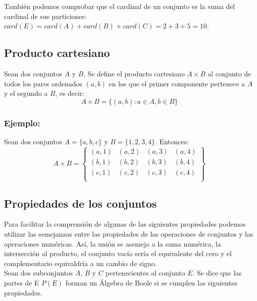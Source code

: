 \documentclass[0_algebra.tex]{subfiles}
\begin{document}
También podemos comprobar que el cardinal de un conjunto es la suma del cardinal de sus particiones:  $card(E)=card(A)+card(B)+card(C)=2+3+5=10$.

\subsection*{Producto cartesiano}
Sean dos conjuntos $A$ y $B$. Se define el producto cartesiano $A\times B$ al conjunto de todos los pares ordenados $(a,b)$ en los que el primer componente pertenece a $A$ y el segundo a $B$, es decir:
$$
A\times B=\lbrace (a,b): a\in A, b\in B \rbrace
$$

\subsubsection*{Ejemplo:}
Sean dos conjuntos $A=\lbrace a,b,c \rbrace$ y $B=\lbrace 1,2,3,4 \rbrace$. Entonces:
$$
A\times B =
\left\lbrace
\begin{matrix}
(a,1) & (a,2) & (a,3) & (a,4)\\
(b,1) & (b,2) & (b,3) & (b,4)\\
(c,1) & (c,2) & (c,3) & (c,4)\\
\end{matrix}
\right\rbrace
$$

\subsection*{Propiedades de los conjuntos}
Para facilitar la comprensión de algunas de las siguientes propiedades podemos utilizar las semejanzas entre las propiedades de las operaciones de conjuntos y las operaciones numéricas. Así, la unión se asemeja a la suma numérica, la intersección al producto, el conjunto vacío sería el equivalente del cero y el complementario equivaldría a un cambio de signo.\\

Sean dos subconjuntos $A$, $B$ y $C$ pertenecientes al conjunto $E$. Se dice que las partes de E $P(E)$ forman un Álgebra de Boole si se cumplen las siguientes propiedades.\\
\end{document}
